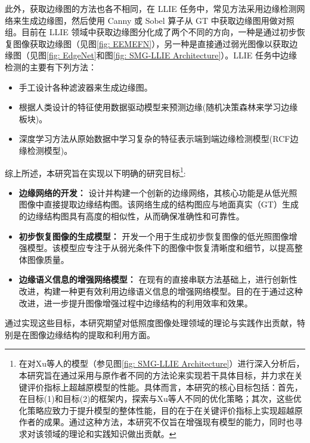 \documentclass[a4paper]{ctexart}
\begin{document}
	此外，获取边缘图的方法也各不相同，在 LLIE 任务中，常见方法采用边缘检测网络来生成边缘图，然后使用 Canny 或 Sobel 算子\cite{maini2009study}从 GT 中获取边缘图用做对照组。目前在 LLIE 领域中获取边缘图分化成了两个不同的方向，一种是通过初步恢复图像获取边缘图（见图\ref{fig: EEMEFN}），另一种是直接通过弱光图像以获取边缘图（见图\ref{fig: EdgeNet}和图\ref{fig: SMG-LLIE Architecture}）。LLIE 任务中边缘检测的主要有下列方法：
	
	\begin{itemize}
		\item [(1)] 手工设计各种滤波器来生成边缘图。
		
		\item [(2)] 根据人类设计的特征使用数据驱动模型来预测边缘(随机决策森林来学习边缘板块)。
		
		\item [(3)] 深度学习方法从原始数据中学习复杂的特征表示端到端边缘检测模型(RCF边缘检测模型\cite{liu2017richer})。
	\end{itemize}
	
	综上所述，本研究旨在实现以下明确的研究目标\footnote{在对Xu等人\cite{xu2023low}的模型（参见图\ref{fig: SMG-LLIE Architecture}）进行深入分析后，本研究旨在通过采用与原作者不同的方法论来实现若干具体目标，并力求在关键评价指标上超越原模型的性能。具体而言，本研究的核心目标包括：首先，在目标(1)和目标(2)的框架内，探索与Xu等人不同的优化策略；其次，这些优化策略应致力于提升模型的整体性能，目的在于在关键评价指标上实现超越原作者的成果。通过这种方法，本研究不仅旨在增强现有模型的能力，同时也寻求对该领域的理论和实践知识做出贡献。}:
	
	\begin{itemize}
		\item [(1)] \textbf{边缘网络的开发：} 设计并构建一个创新的边缘网络，其核心功能是从低光照图像中直接提取边缘结构图。该网络生成的结构图应与地面真实（GT）生成的边缘结构图具有高度的相似性，从而确保准确性和可靠性。
		
		\item [(2)] \textbf{初步恢复图像的生成模型：} 开发一个用于生成初步恢复图像的低光照图像增强模型。该模型应专注于从弱光条件下的图像中恢复清晰度和细节，以提高整体图像质量。
		
		\item [(2)] \textbf{边缘语义信息的增强网络模型：} 在现有的直接串联方法基础上，进行创新性改进，构建一种更有效利用边缘语义信息的增强网络模型。目的在于通过这种改进，进一步提升图像增强过程中边缘结构的利用效率和效果。
	\end{itemize}
	
	通过实现这些目标，本研究期望对低照度图像处理领域的理论与实践作出贡献，特别是在图像边缘结构的提取和利用方面。
	
\end{document}
